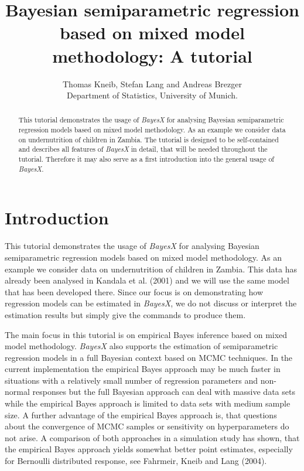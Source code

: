 \documentclass{article}
\begin{document}
\title{Bayesian semiparametric regression based on mixed model methodology: A tutorial}
\author{Thomas Kneib, Stefan Lang and Andreas Brezger\\ [.25cm]
\normalsize Department of Statistics, University of Munich. }
\maketitle

\begin{abstract}
This tutorial demonstrates the usage of {\it BayesX} for analysing
Bayesian semiparametric regression models based on mixed model
methodology. As an example we consider data on undernutrition of
children in Zambia. The tutorial is designed to be self-contained
and describes all features of {\it BayesX} in detail, that will be
needed throughout the tutorial. Therefore it may also serve as a
first introduction into the general usage of {\em BayesX}.
\end{abstract}

\tableofcontents

\newpage
\section{Introduction}\label{data}

This tutorial demonstrates the usage of {\it BayesX} for analysing
Bayesian semiparametric regression models based on mixed model
methodology. As an example we consider data on undernutrition of
children in Zambia. This data has already been analysed in Kandala
et al. (2001) \nocite{kanlan01} and we will use the same model
that has been developed there. Since our focus is on demonstrating
how regression models can be estimated in {\em BayesX}, we do not
discuss or interpret the estimation results but simply give the
commands to produce them.

The main focus in this tutorial is on empirical Bayes inference
based on mixed model methodology. {\it BayesX} also supports the
estimation of semiparametric regression models in a full Bayesian
context based on MCMC techniques. In the current implementation the
empirical Bayes approach may be much faster in situations with a
relatively small number of regression parameters and non-normal
responses but the full Bayesian approach can deal with massive data
sets while the empirical Bayes approach is limited to data sets with
medium sample size. A further advantage of the empirical Bayes
approach is, that questions about the convergence of MCMC samples or
sensitivity on hyperparameters do not arise. A comparison of both
approaches in a simulation study has shown, that the empirical Bayes
approach yields somewhat better point estimates, especially for
Bernoulli distributed response, see Fahrmeir, Kneib and Lang (2004).
\end{document}

